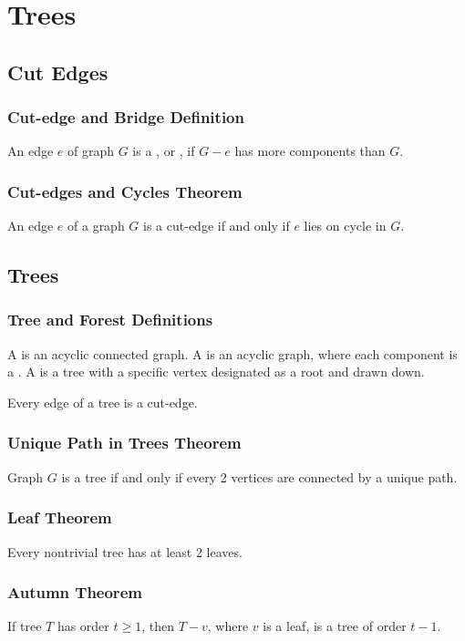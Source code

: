 \section{Trees}

\subsection{Cut Edges}

\subsubsection*{Cut-edge and Bridge Definition}
An edge $e$ of graph $G$ is a , or , if $G-e$ has more components than $G$.

\subsubsection*{Cut-edges and Cycles Theorem}
An edge $e$ of a graph $G$ is a cut-edge if and only if $e$ lies on  cycle in $G$.

\subsection{Trees}

\subsubsection*{Tree and Forest Definitions}
A  is an acyclic connected graph. A  is an acyclic graph, where each component is a . A  is a tree with a specific vertex designated as a root and drawn down.

Every edge of a tree is a cut-edge.

\subsubsection*{Unique Path in Trees Theorem}
Graph $G$ is a tree if and only if every 2 vertices are connected by a unique path.

\subsubsection*{Leaf Theorem}
Every nontrivial tree has at least 2 leaves.

\subsubsection*{Autumn Theorem}
If tree $T$ has order $t \geq 1$, then $T-v$, where $v$ is a leaf, is a tree of order $t-1$.

